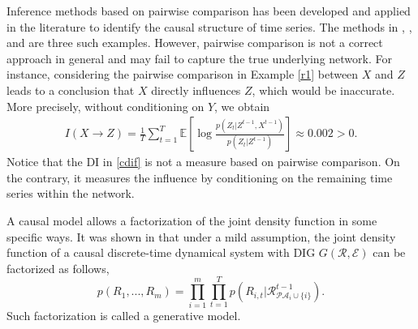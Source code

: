 Inference methods based on pairwise comparison has been developed and applied in the literature to identify the causal structure of time series.  The methods in \citet{billio2012econometric}, \citet{billio2010measuring}, and \citet{allen2010financial} are three such examples.
However,  pairwise comparison is not a correct approach in general and may fail to capture the true underlying network.
For instance,  considering the pairwise comparison in Example \ref{r1} between $X$ and $Z$ leads to a conclusion that $X$ directly influences $Z$, which would be inaccurate.
More precisely, without conditioning on $Y$, we obtain
 \begin{align*}
 I(X\rightarrow Z)=\frac{1}{T}\sum_{t=1}^T\mathbb{E}\left[\log\frac{p(Z_t|Z^{t-1},X^{t-1})}{p(Z_t|Z^{t-1})}\right]\approx 0.002>0.
 \end{align*}
Notice that the DI in \eqref{cdif} is not a measure based on pairwise comparison. On the contrary, it measures the influence by conditioning on the remaining time series within the network. 

\clearpage

\begin{remark}
A causal model allows a factorization of the joint density function in some specific ways.
It was shown in \citet{directed} that under a mild assumption, the joint density function of a causal discrete-time dynamical system with DIG $G(\mathcal{R},\mathcal{E})$ can be factorized as follows,
\begin{equation}\label{abo}
p(R_1,...,R_m)=\prod_{i=1}^{m}\prod_{t=1}^T p(R_{i,t}|\mathcal{R}_{\mathcal{PA}_i\cup\{i\}}^{t-1}).
\end{equation}
Such factorization is called a generative model. 
\end{remark}


